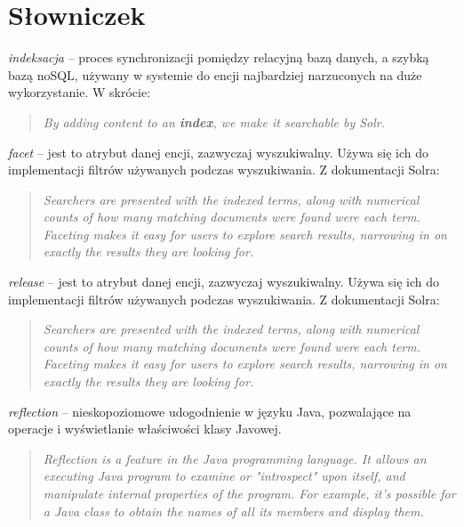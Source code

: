 \section{Słowniczek}
\noindent
\textit{indeksacja} -- proces synchronizacji pomiędzy relacyjną bazą danych, a szybką bazą noSQL, używany w systemie do encji najbardziej narzuconych na duże wykorzystanie. W skrócie: 
\begin{quote}
	\textit{By adding content to an \textbf{index}, we make it searchable by Solr.}\cite{Solr} 
\end{quote}


\noindent
\textit{facet} -- jest to atrybut danej encji, zazwyczaj wyszukiwalny. Używa się ich do implementacji filtrów używanych podczas wyszukiwania. Z dokumentacji Solra:
\begin{quote} \textit{
	Searchers are presented with the indexed terms, along with numerical counts of how many matching documents were found were each term. Faceting makes it easy for users to explore search results, narrowing in on exactly the results they are looking for.
	}\cite{Solr}
\end{quote}


\noindent
\textit{release} -- jest to atrybut danej encji, zazwyczaj wyszukiwalny. Używa się ich do implementacji filtrów używanych podczas wyszukiwania. Z dokumentacji Solra:
\begin{quote} \textit{
		Searchers are presented with the indexed terms, along with numerical counts of how many matching documents were found were each term. Faceting makes it easy for users to explore search results, narrowing in on exactly the results they are looking for.
	}\cite{Solr}
\end{quote}

\noindent
\textit{reflection} -- nieskopoziomowe udogodnienie w języku Java, pozwalające na operacje i wyświetlanie właściwości klasy Javowej.
\begin{quote} \textit{
		Reflection is a feature in the Java programming language. It allows an executing Java program to examine or "introspect" upon itself, and manipulate internal properties of the program. For example, it's possible for a Java class to obtain the names of all its members and display them.
	}\cite{oracle}
\end{quote}




